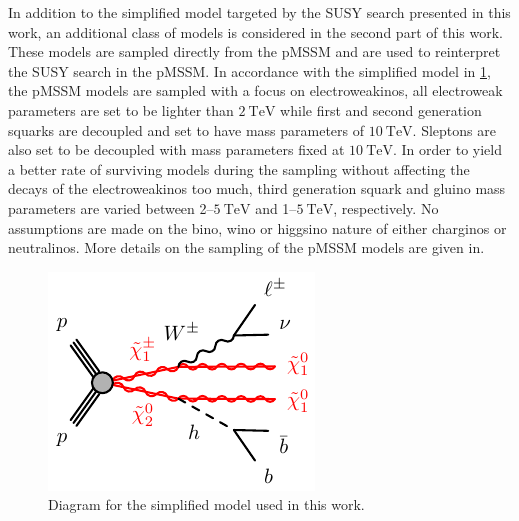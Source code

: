 In addition to the simplified model targeted by the SUSY search presented in this work, an additional class of models is considered in the second part of this work. These models are sampled directly from the pMSSM and are used to reinterpret the SUSY search in the pMSSM. In accordance with the simplified model in \cref{fig:Wh_model}, the pMSSM models are sampled with a focus on electroweakinos, \ie all electroweak parameters are set to be lighter than $\SI{2}{\TeV}$ while first and second generation squarks are decoupled and set to have mass parameters of $\SI{10}{\TeV}$. Sleptons are also set to be decoupled with mass parameters fixed at $\SI{10}{\TeV}$.  In order to yield a better rate of surviving models during the sampling without affecting the decays of the electroweakinos too much, third generation squark and gluino mass parameters are varied between 2--$\SI{5}{\TeV}$ and 1--$\SI{5}{\TeV}$, respectively. No assumptions are made on the bino, wino or higgsino nature of either charginos or neutralinos. More details on the sampling of the pMSSM models are given in. 

\begin{figure}
	\centering\includegraphics[width=.4\textwidth]{model_c1n2_Wh}
	\caption{Diagram for the simplified model used in this work.}\label{fig:Wh_model}
\end{figure}


